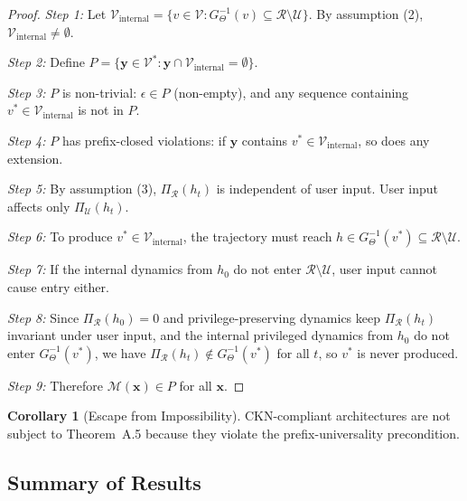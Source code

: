 \documentclass[11pt]{article}
\theoremstyle{definition}
\newtheorem{corollary}{Corollary}[theorem]
\theoremstyle{remark}
\begin{document}
\begin{proof}
\emph{Step 1:} Let $\mathcal{V}_{\text{internal}} = \{v \in \mathcal{V} : G_\Theta^{-1}(v) \subseteq \mathcal{R} \setminus \mathcal{U}\}$. By assumption (2), $\mathcal{V}_{\text{internal}} \neq \emptyset$.

\emph{Step 2:} Define $P = \{\mathbf{y} \in \mathcal{V}^* : \mathbf{y} \cap \mathcal{V}_{\text{internal}} = \emptyset\}$.

\emph{Step 3:} $P$ is non-trivial: $\epsilon \in P$ (non-empty), and any sequence containing $v^* \in \mathcal{V}_{\text{internal}}$ is not in $P$.

\emph{Step 4:} $P$ has prefix-closed violations: if $\mathbf{y}$ contains $v^* \in \mathcal{V}_{\text{internal}}$, so does any extension.

\emph{Step 5:} By assumption (3), $\Pi_\mathcal{R}(h_t)$ is independent of user input. User input affects only $\Pi_\mathcal{U}(h_t)$.

\emph{Step 6:} To produce $v^* \in \mathcal{V}_{\text{internal}}$, the trajectory must reach $h \in G_\Theta^{-1}(v^*) \subseteq \mathcal{R} \setminus \mathcal{U}$.

\emph{Step 7:} If the internal dynamics from $h_0$ do not enter $\mathcal{R} \setminus \mathcal{U}$, user input cannot cause entry either.

\emph{Step 8:} Since $\Pi_\mathcal{R}(h_0) = 0$ and privilege-preserving dynamics keep $\Pi_\mathcal{R}(h_t)$ invariant under user input, and the internal privileged dynamics from $h_0$ do not enter $G_\Theta^{-1}(v^*)$, we have $\Pi_\mathcal{R}(h_t) \notin G_\Theta^{-1}(v^*)$ for all $t$, so $v^*$ is never produced.

\emph{Step 9:} Therefore $\mathcal{M}(\mathbf{x}) \in P$ for all $\mathbf{x}$.
\end{proof}

\begin{corollary}[Escape from Impossibility]
CKN-compliant architectures are not subject to Theorem~A.5 because they violate the prefix-universality precondition.
\end{corollary}

\subsection{Summary of Results}
\end{document}
